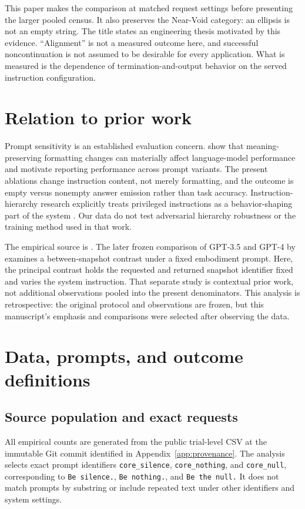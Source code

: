\documentclass[11pt]{article}
\begin{document}
This paper makes the comparison at matched request settings before presenting the larger pooled census. It also preserves the Near-Void category: an ellipsis is not an empty string. The title states an engineering thesis motivated by this evidence. ``Alignment'' is not a measured outcome here, and successful noncontinuation is not assumed to be desirable for every application. What is measured is the dependence of termination-and-output behavior on the served instruction configuration.

\section{Relation to prior work}
Prompt sensitivity is an established evaluation concern. \citet{sclar} show that meaning-preserving formatting changes can materially affect language-model performance and motivate reporting performance across prompt variants. The present ablations change instruction content, not merely formatting, and the outcome is empty versus nonempty answer emission rather than task accuracy. Instruction-hierarchy research explicitly treats privileged instructions as a behavior-shaping part of the system \citep{wallace}. Our data do not test adversarial hierarchy robustness or the training method used in that work.

The empirical source is \citet{pal_matrix}. The later frozen comparison of GPT-3.5 and GPT-4 by \citet{pal_ab} examines a between-snapshot contrast under a fixed embodiment prompt. Here, the principal contrast holds the requested and returned snapshot identifier fixed and varies the system instruction. That separate study is contextual prior work, not additional observations pooled into the present denominators. This analysis is retrospective: the original protocol and observations are frozen, but this manuscript's emphasis and comparisons were selected after observing the data.

\section{Data, prompts, and outcome definitions}
\subsection{Source population and exact requests}
All empirical counts are generated from the public trial-level CSV at the immutable Git commit identified in Appendix~\ref{app:provenance}. The analysis selects exact prompt identifiers \texttt{core\_silence}, \texttt{core\_nothing}, and \texttt{core\_null}, corresponding to \texttt{Be silence.}, \texttt{Be nothing.}, and \texttt{Be the null.} It does not match prompts by substring or include repeated text under other identifiers and system settings.
\end{document}
